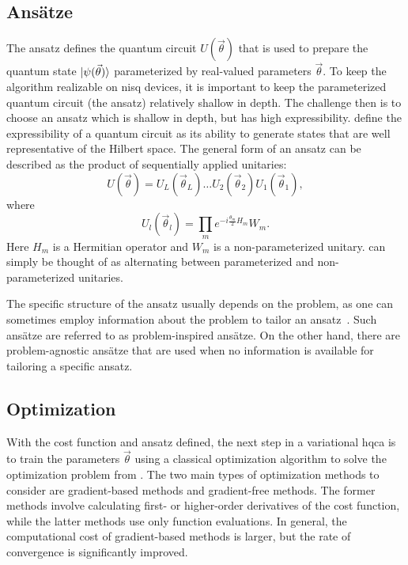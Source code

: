 \subsection{Ans{\"a}tze}
The ansatz defines the quantum circuit $U(\vec{\theta})$ that is used to prepare the quantum state $\vert{\psi(\vec{\theta})}\rangle$ parameterized by real-valued parameters $\vec{\theta}$.
To keep the algorithm realizable on \gls{nisq} devices, it is important to keep the parameterized quantum circuit (the ansatz) relatively shallow in depth.
The challenge then is to choose an ansatz which is shallow in depth, but has high expressibility.
\textcite{sim2019expressibility} define the expressibility of a quantum circuit as its ability to generate states that are well representative of the Hilbert space.
The general form of an ansatz can be described as the product of sequentially applied unitaries:
\begin{equation}
U(\vec{\theta}) = U_L(\vec{\theta}_L) \ldots U_2(\vec{\theta}_2)U_1(\vec{\theta}_1),
\end{equation}
where
\begin{equation} \label{eqn:ansatz-unitary}
U_l(\vec{\theta}_l) = \prod_{m} e^{-i \tfrac{\theta_m}{2} H_m}W_m.
\end{equation}
Here $H_m$ is a Hermitian operator and $W_m$ is a non-parameterized unitary.
 can simply be thought of as alternating between parameterized and non-parameterized unitaries.

The specific structure of the ansatz usually depends on the problem, as one can sometimes employ information about the problem to tailor an ansatz~\cite{cerezo2020variational}.
Such ans{\"a}tze are referred to as problem-inspired ans{\"a}tze.
On the other hand, there are problem-agnostic ans{\"a}tze that are used when no information is available for tailoring a specific ansatz.

\subsection{Optimization}
With the cost function and ansatz defined, the next step in a variational \gls{hqca} is to train the parameters $\vec{\theta}$ using a classical optimization algorithm to solve the optimization problem from .
The two main types of optimization methods to consider are gradient-based methods and gradient-free methods.
The former methods involve calculating first- or higher-order derivatives of the cost function, while the latter methods use only function evaluations.
In general, the computational cost of gradient-based methods is larger, but the rate of convergence is significantly improved.

